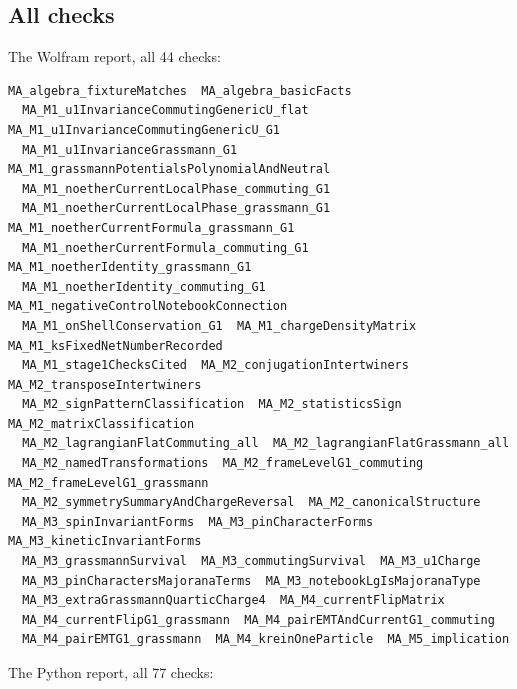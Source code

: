 \documentclass[11pt]{article}
\begin{document}
\subsection{All checks}

The Wolfram report, all 44 checks:

\begin{Verbatim}[fontsize=\small]
  MA_algebra_fixtureMatches  MA_algebra_basicFacts
  MA_M1_u1InvarianceCommutingGenericU_flat  MA_M1_u1InvarianceCommutingGenericU_G1
  MA_M1_u1InvarianceGrassmann_G1  MA_M1_grassmannPotentialsPolynomialAndNeutral
  MA_M1_noetherCurrentLocalPhase_commuting_G1
  MA_M1_noetherCurrentLocalPhase_grassmann_G1  MA_M1_noetherCurrentFormula_grassmann_G1
  MA_M1_noetherCurrentFormula_commuting_G1  MA_M1_noetherIdentity_grassmann_G1
  MA_M1_noetherIdentity_commuting_G1  MA_M1_negativeControlNotebookConnection
  MA_M1_onShellConservation_G1  MA_M1_chargeDensityMatrix  MA_M1_ksFixedNetNumberRecorded
  MA_M1_stage1ChecksCited  MA_M2_conjugationIntertwiners  MA_M2_transposeIntertwiners
  MA_M2_signPatternClassification  MA_M2_statisticsSign  MA_M2_matrixClassification
  MA_M2_lagrangianFlatCommuting_all  MA_M2_lagrangianFlatGrassmann_all
  MA_M2_namedTransformations  MA_M2_frameLevelG1_commuting  MA_M2_frameLevelG1_grassmann
  MA_M2_symmetrySummaryAndChargeReversal  MA_M2_canonicalStructure
  MA_M3_spinInvariantForms  MA_M3_pinCharacterForms  MA_M3_kineticInvariantForms
  MA_M3_grassmannSurvival  MA_M3_commutingSurvival  MA_M3_u1Charge
  MA_M3_pinCharactersMajoranaTerms  MA_M3_notebookLgIsMajoranaType
  MA_M3_extraGrassmannQuarticCharge4  MA_M4_currentFlipMatrix
  MA_M4_currentFlipG1_grassmann  MA_M4_pairEMTAndCurrentG1_commuting
  MA_M4_pairEMTG1_grassmann  MA_M4_kreinOneParticle  MA_M5_implication
\end{Verbatim}

The Python report, all 77 checks:
\end{document}
